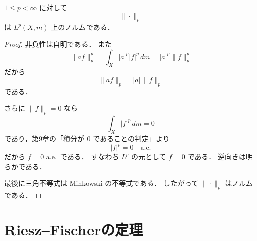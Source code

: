 \begin{proposition}
$1\le p<\infty$ に対して
\[
\|\cdot\|_p
\]
は $L^p(X,m)$ 上のノルムである．
\end{proposition}
\begin{proof}
非負性は自明である．
また
\[
\|af\|_p^p
=
\int_X |a|^p|f|^p\,dm
=
|a|^p\|f\|_p^p
\]
だから
\[
\|af\|_p=|a|\,\|f\|_p
\]
である．

さらに $\|f\|_p=0$ なら
\[
\int_X |f|^p\,dm=0
\]
であり，第9章の「積分が $0$ であることの判定」より
\[
|f|^p=0 \quad \text{a.e.}
\]
だから $f=0$ a.e.\ である．
すなわち $L^p$ の元として $f=0$ である．
逆向きは明らかである．

最後に三角不等式は Minkowski の不等式である．
したがって $\|\cdot\|_p$ はノルムである．
\end{proof}

\section{Riesz--Fischerの定理}

